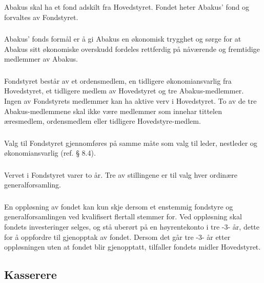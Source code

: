 \subsubsection{}
Abakus skal ha et fond adskilt fra Hovedstyret. Fondet heter Abakus’ fond og forvaltes av Fondstyret.

\subsubsection{}
Abakus’ fonds formål er å gi Abakus en økonomisk trygghet og sørge for at Abakus sitt
økonomiske overskudd fordeles rettferdig på nåværende og fremtidige medlemmer av Abakus.

\subsubsection{}
Fondstyret består av et ordensmedlem, en tidligere økonomiansvarlig fra Hovedstyret, et tidligere
medlem av Hovedstyret og tre Abakus-medlemmer. Ingen av Fondstyrets medlemmer kan ha
aktive verv i Hovedstyret. To av de tre Abakus-medlemmene skal ikke være medlemmer som
innehar tittelen æresmedlem, ordensmedlem eller tidligere Hovedstyre-medlem.

\subsubsection{}
Valg til Fondstyret gjennomføres på samme måte som valg til leder, nestleder og
økonomiansvarlig (ref. § 8.4).

\subsubsection{}
Vervet i Fondstyret varer to år. Tre av stillingene er til valg hver ordinære generalforsamling.

\subsubsection{}
En oppløsning av fondet kan kun skje dersom et enstemmig fondstyre og generalforsamlingen
ved kvalifisert flertall stemmer for. Ved oppløsning skal fondets investeringer selges, og stå
uberørt på en høyrentekonto i tre -3- år, dette for å oppfordre til gjenopptak av fondet. Dersom
det går tre -3- år etter oppløsningen uten at fondet blir gjenopptatt, tilfaller fondets midler
Hovedstyret.

\subsection{Kasserere}

